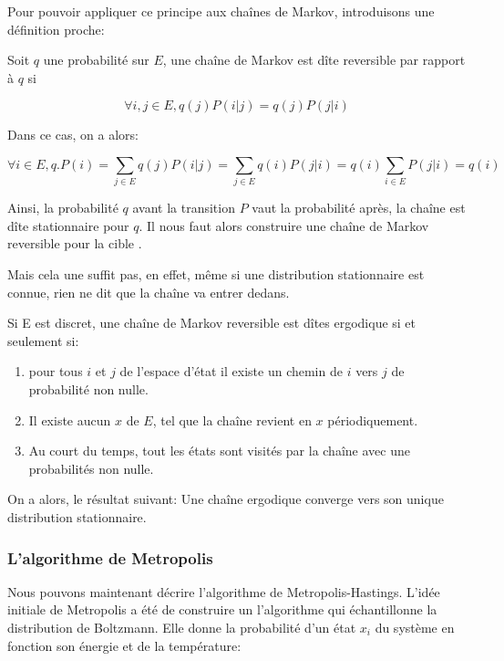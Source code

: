 Pour pouvoir appliquer ce principe aux chaînes de Markov, introduisons une définition proche:

Soit $q$ une probabilité sur $E$, une chaîne de Markov est dîte reversible par rapport à $q$ si

\begin{equation}
\forall i,j \in E, q(j)P(i|j)=q(j)P(j|i)
\end{equation}

Dans ce cas, on a alors:

\begin{equation}
\forall i \in E, q.P (i) = \sum_{j \in E} q(j)P(i|j) = \sum_{j \in E} q(i)P(j|i) = q(i) \sum_{i \in E}P(j|i) = q(i)
\end{equation}

Ainsi, la probabilité $q$ avant la transition $P$ vaut la probabilité après, la chaîne est dîte stationnaire pour $q$. Il nous faut alors construire une chaîne de Markov reversible pour la cible \pi.

Mais cela une suffit pas, en effet, même si une distribution stationnaire est connue, rien ne dit que la chaîne va entrer dedans. 

Si E est discret, une chaîne de Markov reversible est dîtes ergodique si et seulement si:

\begin{enumerate}
  \label{crit_ergo}
\item pour tous $i$ et $j$ de l'espace d'état il existe un chemin de $i$  vers $j$  de probabilité non nulle. 
\item Il existe aucun $x$ de $E$, tel que la chaîne revient en $x$ périodiquement.
\item  Au court du temps, tout les états sont visités par la chaîne avec une probabilités non nulle. 
\end{enumerate}

On a alors, le résultat suivant:
Une chaîne ergodique converge vers son unique distribution stationnaire.

\subsubsection{L'algorithme de Metropolis}

Nous pouvons maintenant décrire l'algorithme de Metropolis-Hastings. L'idée initiale de Metropolis a été de construire un l'algorithme qui échantillonne la distribution de Boltzmann. Elle donne la probabilité d'un état $x_i$ du système en fonction son énergie et de la température:

